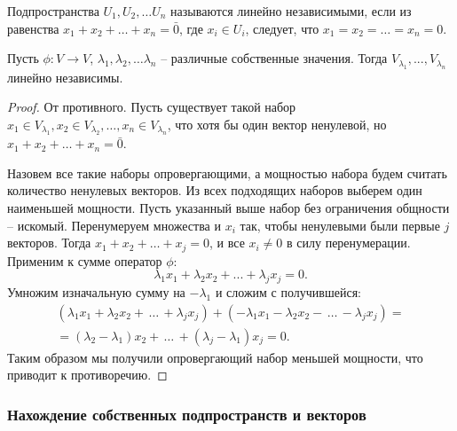 \begin{reminder}
    Подпространства $U_1, U_2, \dots U_n$ называются линейно независимыми, если из равенства 
    $x_1 + x_2 + \dots + x_n = \bar{0}$, где $x_i \in U_i$, следует, что $x_1 = x_2 = \dots = x_n = 0$.
\end{reminder}

\begin{theorem}
    \label{o_lnz}
    Пусть $\phi: V \to V$, $\lambda_1, \lambda_2, \dots \lambda_n$ -- различные собственные значения. 
    Тогда $V_{\lambda_1}, ..., V_{\lambda_n}$ линейно независимы.
\end{theorem}

\begin{proof}
    От противного. Пусть существует такой набор
    $x_1 \in V_{\lambda_1}, x_2 \in V_{\lambda_2}, \dots, 
    x_n \in V_{\lambda_n}$, что хотя бы один вектор ненулевой, но $x_1 + x_2 + \dots + x_n = \bar{0}$. 

    Назовем все такие наборы опровергающими, а мощностью набора будем считать количество ненулевых 
    векторов. Из всех подходящих наборов выберем один наименьшей мощности. Пусть 
    указанный выше набор без ограничения общности -- искомый. Перенумеруем множества и $x_i$ так,
    чтобы ненулевыми были первые $j$ векторов. Тогда $x_1 + x_2 + \dots + x_j = 0$, и все
    $x_i \neq 0$ в силу перенумерации. Применим к сумме оператор $\phi$:
    $$\lambda_1 x_1 + \lambda_2 x_2 + ... + \lambda_j x_j = 0.$$ 
    Умножим изначальную сумму на $-\lambda_1$ и сложим с получившейся: 
    \begin{align*}
        (\lambda_1 x_1 + \lambda_2 x_2 + \, \dots \, + \lambda_j x_j) + (-\lambda_1 x_1 - \lambda_2 x_2 
        - \, \dots \, - \lambda_j x_j) = \\ = (\lambda_2 - \lambda_1) x_2 + \, \dots \, + (\lambda_j - 
        \lambda_1) x_j = 0.
    \end{align*}
    Таким образом мы получили опровергающий набор меньшей мощности, что приводит к противоречию.
\end{proof}

\subsubsection{Нахождение собственных подпространств и векторов}  

